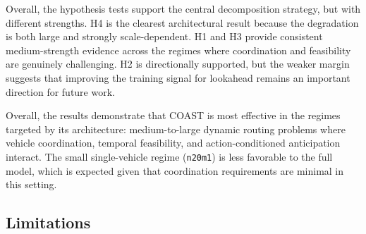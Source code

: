 \documentclass[conference]{IEEEtran}
\begin{document}
Overall, the hypothesis tests support the central decomposition strategy, but with different strengths. H4 is the clearest architectural result because the degradation is both large and strongly scale-dependent. H1 and H3 provide consistent medium-strength evidence across the regimes where coordination and feasibility are genuinely challenging. H2 is directionally supported, but the weaker margin suggests that improving the training signal for lookahead remains an important direction for future work.

\begin{table}[t]
\centering
\caption{Hypothesis evaluation summary. Positive gaps indicate that the ablated variant incurs higher cost than COAST.}
\label{tab:hypotheses}
\footnotesize
{}
\end{table}

Overall, the results demonstrate that COAST is most effective in the regimes targeted by its architecture: medium-to-large dynamic routing problems where vehicle coordination, temporal feasibility, and action-conditioned anticipation interact. The small single-vehicle regime (\texttt{n20m1}) is less favorable to the full model, which is expected given that coordination requirements are minimal in this setting.

\subsection{Limitations}
\end{document}
